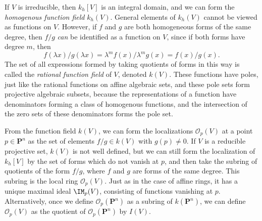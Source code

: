 If $V$ is irreducible, then $k_h[V]$ is an integral domain, and we can form the \emph{homogenous function field} $k_h(V)$. General elements of $k_h(V)$ cannot be viewed as functions on $V$. However, if $f$ and $g$ are both homogeneous forms of the same degree, then $f/g$ \emph{can} be identified as a function on $V$, since if both forms have degree $m$, then
%
\[ f(\lambda x)/g(\lambda x) = \lambda^m f(x) / \lambda^m g(x) = f(x)/g(x). \]
%
The set of all expressions formed by taking quotients of forms in this way is called the \emph{rational function field} of $V$, denoted $k(V)$. These functions have poles, just like the rational functions on affine algebraic sets, and these pole sets form projective algebraic subsets, because the representations of a function have denominators forming a class of homogenous functions, and the intersection of the zero sets of these denominators forms the pole set.

From the function field $k(V)$, we can form the localizations $\mathcal{O}_p(V)$ at a point $p \in \mathbf{P}^n$ as the set of elements $f/g \in k(V)$ with $g(p) \neq 0$. If $V$ is a reducible projective set, $k(V)$ is not well defined, but we can still form the localization of $k_h[V]$ by the set of forms which do not vanish at $p$, and then take the subring of quotients of the form $f/g$, where $f$ and $g$ are forms of the same degree. This subring is the local ring $\mathcal{O}_p(V)$. Just as in the case of affine rings, it has a unique maximal ideal $\IM_p(V)$, consisting of functions vanishing at $p$. Alternatively, once we define $\mathcal{O}_p(\mathbf{P}^n)$ as a subring of $k(\mathbf{P}^n)$, we can define $\mathcal{O}_p(V)$ as the quotient of $\mathcal{O}_p(\mathbf{P}^n)$ by $I(V)$.

